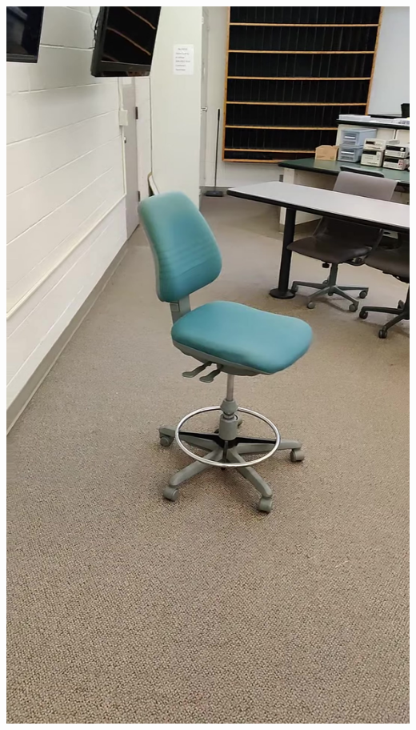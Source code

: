 \documentclass{article}
\begin{document}
\begin{center}
    \includegraphics[scale=0.04]{images/chair1.jpg}

\end{center}
\end{document}

